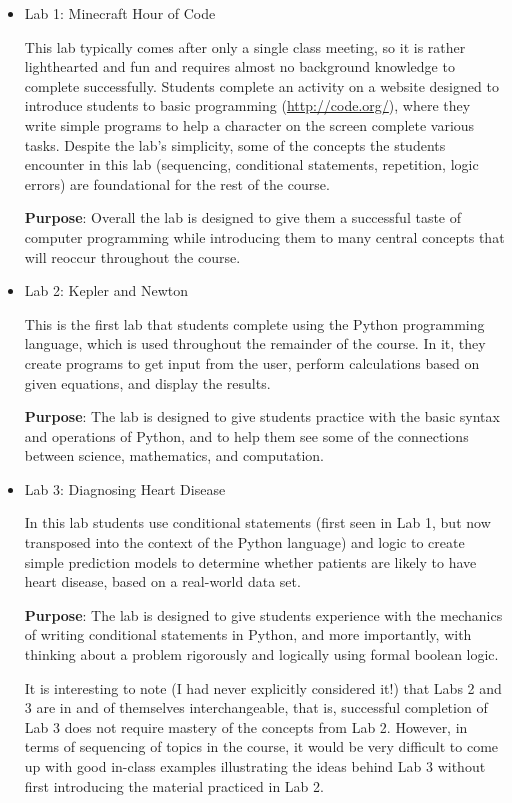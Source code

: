 \documentclass{article}
\begin{document}
\begin{itemize}
\item Lab 1: Minecraft Hour of Code

  This lab typically comes after only a single class meeting, so it is
  rather lighthearted and fun and requires almost no background
  knowledge to complete successfully.  Students complete an activity
  on a website designed to introduce students to basic programming
  (\url{http://code.org/}), where they write simple programs to help a
  character on the screen complete various tasks. Despite the lab's
  simplicity, some of the concepts the students encounter in this lab
  (sequencing, conditional statements, repetition, logic errors) are
  foundational for the rest of the course.

  \textbf{Purpose}: Overall the lab is designed to give them a
  successful taste of computer programming while introducing them to
  many central concepts that will reoccur throughout the course.

\item Lab 2: Kepler and Newton

  This is the first lab that students complete using the Python
  programming language, which is used throughout the remainder of the
  course.  In it, they create programs to get input from the user,
  perform calculations based on given equations, and display the
  results.

  \textbf{Purpose}: The lab is designed to give students practice with
  the basic syntax and operations of Python, and to help them see some
  of the connections between science, mathematics, and computation.

\item Lab 3: Diagnosing Heart Disease

  In this lab students use conditional statements (first seen in Lab
  1, but now transposed into the context of the Python language) and
  logic to create simple prediction models to determine whether
  patients are likely to have heart disease, based on a real-world
  data set.

  \textbf{Purpose}: The lab is designed to give students experience
  with the mechanics of writing conditional statements in Python, and
  more importantly, with thinking about a problem rigorously and
  logically using formal boolean logic.

  It is interesting to note (I had never explicitly considered it!)
  that Labs 2 and 3 are in and of themselves interchangeable, that is,
  successful completion of Lab 3 does not require mastery of the
  concepts from Lab 2.  However, in terms of sequencing of topics in
  the course, it would be very difficult to come up with good in-class
  examples illustrating the ideas behind Lab 3 without first
  introducing the material practiced in Lab 2.


\end{itemize}
\end{document}
